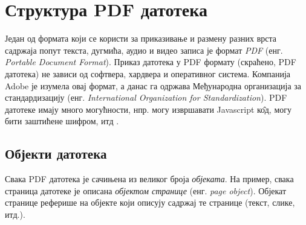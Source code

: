 \documentclass[12pt,oneside]{memoir}
\begin{document}
\chapter{Структура PDF датотека}
\label{chp:pdfStruktura}

Један од формата који се користи за приказивање и размену разних врста садржаја попут текста, дугмића, аудио и видео записа је формат \textit{PDF} (енг. \textit{Portable Document Format}). Приказ датотека у PDF формату (скраћено, PDF датотека) не зависи од софтвера, хардвера и оперативног система. Компанија Adobe је изумела овај формат, а данас га одржава Међународна организација за стандардизацију (енг. \textit{International Organization for Standardization}). PDF датотеке имају много могућности, нпр. могу извршавати Javascript к\^{о}д, могу бити заштићене шифром, итд \cite{adobePdf1, adobePdf2}.

\section{Објекти датотека}
\label{sec:objektiPDF}

Свака PDF датотека је сачињена из великог броја \textit{објеката}. На пример, свака страница датотеке је описана \textit{објектом странице} (енг. \textit{page object}). Објекат странице реферише на објекте који описују садржај те странице (текст, слике, итд.).
\end{document}
